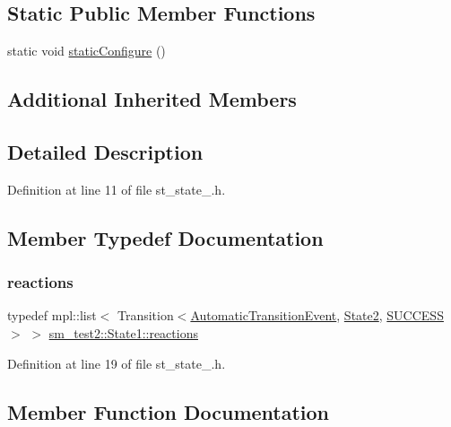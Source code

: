 \subsection*{Static Public Member Functions}
\begin{DoxyCompactItemize}
\item 
static void \hyperlink{structsm__test2_1_1State1_a3252c7af0ed6045e6860531fa9ab5120}{static\+Configure} ()
\end{DoxyCompactItemize}
\subsection*{Additional Inherited Members}


\subsection{Detailed Description}


Definition at line 11 of file st\+\_\+state\+\_.\+h.



\subsection{Member Typedef Documentation}
\mbox{\label{structsm__test2_1_1State1_a8c6681c606915f444d9286235745b312}} 
\subsubsection{\texorpdfstring{reactions}{reactions}}
{\footnotesize\ttfamily typedef mpl\+::list$<$ Transition$<$\hyperlink{structsm__test2_1_1AutomaticTransitionEvent}{Automatic\+Transition\+Event}, \hyperlink{structsm__test2_1_1State2}{State2}, \hyperlink{classSUCCESS}{S\+U\+C\+C\+E\+SS}$>$ $>$ \hyperlink{structsm__test2_1_1State1_a8c6681c606915f444d9286235745b312}{sm\+\_\+test2\+::\+State1\+::reactions}}



Definition at line 19 of file st\+\_\+state\+\_.\+h.



\subsection{Member Function Documentation}
\mbox{\label{structsm__test2_1_1State1_a1681290d4b5b0480dccbf80848026611}} 
